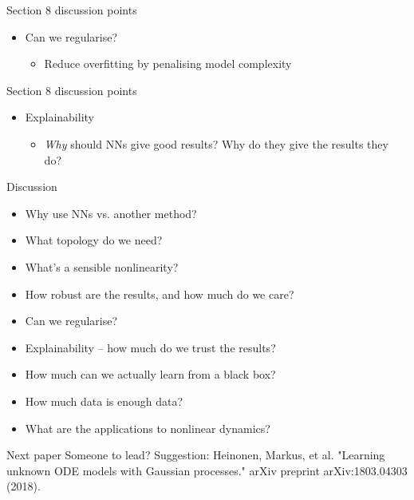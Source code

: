 \documentclass[presentation]{beamer}
\begin{document}
\begin{frame}[label={sec:org242c133}]{Section 8 discussion points}
\begin{itemize}
\item Can we regularise?
\begin{itemize}
\item Reduce overfitting by penalising model complexity
\end{itemize}
\end{itemize}
\end{frame}
\begin{frame}[label={sec:orgc156a9e}]{Section 8 discussion points}
\begin{itemize}
\item Explainability
\begin{itemize}
\item \emph{Why} should NNs give good results? Why do they give the results they do?
\end{itemize}
\end{itemize}
\end{frame}

\begin{frame}[label={sec:org76a12df}]{Discussion}
\begin{itemize}
\item Why use NNs vs. another method?
\item What topology do we need?
\item What's a sensible nonlinearity?
\item How robust are the results, and how much do we care?
\item Can we regularise?
\item Explainability -- how much do we trust the results?
\item How much can we actually learn from a black box?
\item How much data is enough data?
\item What are the applications to nonlinear dynamics?
\end{itemize}
\end{frame}

\begin{frame}[label={sec:org0e42c05}]{Next paper}
Someone to lead?
\vfill
Suggestion: Heinonen, Markus, et al. "Learning unknown ODE models with Gaussian processes." arXiv preprint arXiv:1803.04303 (2018).
\end{frame}
\end{document}
